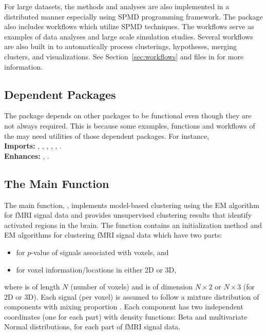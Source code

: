 For large datasets, the methods and analyses are also implemented in a
distributed manner 
especially using SPMD programming framework.
The package also includes workflows which utilize SPMD techniques.
The workflows serve as examples of data analyses and
large scale simulation studies. Several workflows are also built in to
automatically process clusterings, hypotheses, merging clusters, and
visualizations. See Section~\ref{sec:workflows} and files in
 for more information.


\subsection[Dependent Packages]{Dependent Packages}

The  package depends on other  packages to be
functional even though they are not always required. This is because
some examples, functions and workflows of the 
 may need utilities of those dependent packages.
For instance,
\\
\hspace*{0.5cm}
{\bf Imports:} , , ,
, , .
\\
\hspace*{0.5cm}
{\bf Enhances:} , .


\subsection[The Main Function]{The Main Function}

The main function, , implements model-based clustering
using the EM algorithm~\citep{McLachlan1996} for fMRI signal data and
provides unsupervised clustering results that identify activated regions
in the brain. The  function contains an initialization method and
EM algorithms for clustering fMRI signal data which have two parts:
\begin{itemize}
\item
{} for $p$-value of signals associated with voxels, and
\item
{} for voxel information/locations in either 2D or 3D,
\end{itemize}
where  is of length $N$ (number of voxels) and
 is of dimension $N \times 2$ or $N \times 3$ (for 2D or 3D).
Each signal (per voxel) is assumed to follow a mixture distribution
of  components with mixing proportion .
Each component has
two independent coordinates (one for each part)
with density functions: Beta and multivariate
Normal distributions, for each part of fMRI signal data.
\\

